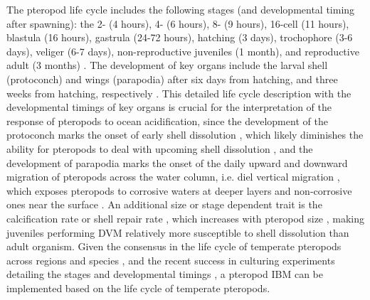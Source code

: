 The pteropod life cycle includes the following stages (and developmental timing after spawning): the 2- (4 hours), 4- (6 hours), 8- (9 hours), 16-cell (11 hours), blastula (16 hours), gastrula (24-72 hours), hatching (3 days), trochophore (3-6 days), veliger (6-7 days), non-reproductive juveniles (1 month), and reproductive adult (3 months) \citep{Thabet2015Lifestages}. The development of key organs include the larval shell (protoconch) and wings (parapodia) after six days from hatching, and three weeks from hatching, respectively \citep{Thabet2015Lifestages}.  This detailed life cycle description with the developmental timings of key organs is crucial for the interpretation of the response of pteropods to ocean acidification, since the development of the protoconch marks the onset of early shell dissolution \citep{Thabet2015Lifestages,Johnson2016}, which likely diminishes the ability for pteropods to deal with upcoming shell dissolution \citep{Bednarsek2017ExposureHistory}, and the development of parapodia marks the onset of the daily upward and downward migration of pteropods across the water column, i.e. diel vertical migration \citep[DVM; ][]{lalli1989pelagic,Mackas2005DVM,Hunt2008TopPredators}, which exposes pteropods to corrosive waters at deeper layers and non-corrosive ones near the surface \citep{Bednarsek2015VerticalDistribution}. An additional size or stage dependent trait is the calcification rate or shell repair rate \citep{Comeau2010RepairRates}, which increases with pteropod size \citep{Bednarsek2014CalcificationDissolution}, making juveniles performing DVM relatively more susceptible to shell dissolution than adult organism. Given the consensus in the life cycle of temperate pteropods across regions and species \citep{lalli1989pelagic,Dadon1992Reproduction,Wang2017Lifecycle,Maas2020Lipids}, and the recent success in culturing experiments detailing the stages and developmental timings \citep{Howes2014Lab,Thabet2015Lifestages}, a pteropod IBM can be implemented based on the life cycle of temperate pteropods.








